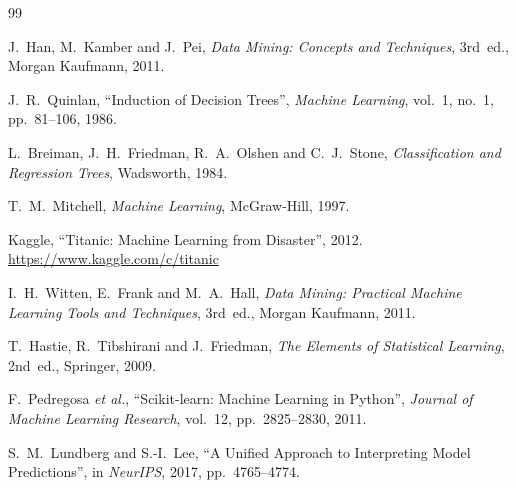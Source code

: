 \documentclass[10pt,a4paper,twocolumn]{article}
\begin{document}
\begin{thebibliography}{99}
\small

J.~Han, M.~Kamber and J.~Pei, \emph{Data Mining: Concepts and Techniques}, 3rd~ed.,
Morgan Kaufmann, 2011.

J.~R.~Quinlan, ``Induction of Decision Trees'', \emph{Machine Learning}, vol.~1, no.~1,
pp.~81--106, 1986.

L.~Breiman, J.~H.~Friedman, R.~A.~Olshen and C.~J.~Stone,
\emph{Classification and Regression Trees}, Wadsworth, 1984.

T.~M.~Mitchell, \emph{Machine Learning}, McGraw-Hill, 1997.

Kaggle, ``Titanic: Machine Learning from Disaster'', 2012.\\
\url{https://www.kaggle.com/c/titanic}

I.~H.~Witten, E.~Frank and M.~A.~Hall,
\emph{Data Mining: Practical Machine Learning Tools and Techniques}, 3rd~ed.,
Morgan Kaufmann, 2011.

T.~Hastie, R.~Tibshirani and J.~Friedman,
\emph{The Elements of Statistical Learning}, 2nd~ed., Springer, 2009.

F.~Pedregosa \emph{et al.}, ``Scikit-learn: Machine Learning in Python'',
\emph{Journal of Machine Learning Research}, vol.~12, pp.~2825--2830, 2011.

S.~M.~Lundberg and S.-I.~Lee, ``A Unified Approach to Interpreting Model
Predictions'', in \emph{NeurIPS}, 2017, pp.~4765--4774.

\end{thebibliography}
\end{document}
